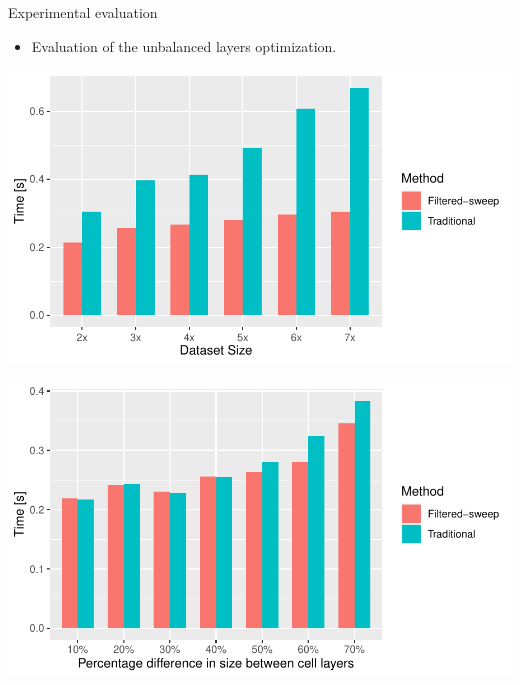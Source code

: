 \documentclass{beamer}
\begin{document}
    \begin{frame}{Experimental evaluation}
        \begin{itemize}
            \item Evaluation of the unbalanced layers optimization.
        \end{itemize}
        \vspace{1cm}
        \begin{minipage}{0.49\textwidth}
            \centering
            \includegraphics[width=\textwidth]{figures/unbalance1}
        \end{minipage}\hfill %
        \begin{minipage}{0.49\textwidth}
            \centering
            \includegraphics[width=\textwidth]{figures/unbalance2}
        \end{minipage}
    \end{frame}    
\end{document}
